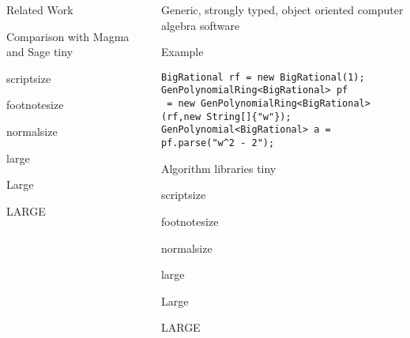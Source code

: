 \documentclass[final]{beamer}
\begin{document}
\begin{frame}[fragile]
\begin{columns}[t]
\begin{column}{.3\linewidth}
\begin{block}{\large Related Work}
\par
  \end{block}
  \hfill
  \begin{block}{\large Comparison with Magma and Sage}
      \centering
      {\tiny tiny}\par
      {\scriptsize scriptsize}\par
      {\footnotesize footnotesize}\par
      {\normalsize normalsize}\par
      {\large large}\par
      {\Large Large}\par
      {\LARGE LARGE}\par
  \end{block}

\end{column}

\begin{column}{.3\linewidth}
 
  \begin{block}{\large Generic, strongly typed, object oriented computer algebra software}
      \centering
  \end{block}
  \hfill
  \begin{block}{\large Example}
\scriptsize %
\begin{lstlisting} 
BigRational rf = new BigRational(1); 
GenPolynomialRing<BigRational> pf 
 = new GenPolynomialRing<BigRational>(rf,new String[]{"w"});
GenPolynomial<BigRational> a = pf.parse("w^2 - 2");
\end{lstlisting} 
  \end{block}
  \hfill
  \begin{block}{\large Algorithm libraries}
      \centering
      {\tiny tiny}\par
      {\scriptsize scriptsize}\par
      {\footnotesize footnotesize}\par
      {\normalsize normalsize}\par
      {\large large}\par
      {\Large Large}\par
      {\LARGE LARGE}\par
  \end{block}


\end{column}
\end{columns}
\end{frame}
\end{document}
